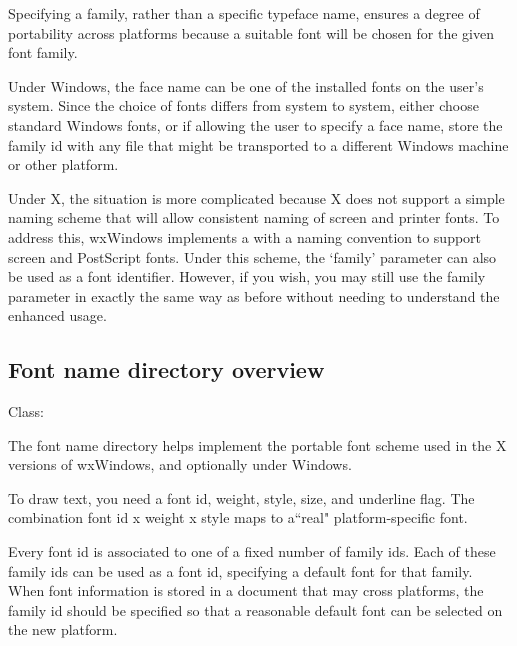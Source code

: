 Specifying a family, rather than a specific typeface name, ensures a degree of portability
across platforms because a suitable font will be chosen for the given font family.

Under Windows, the face name can be one of the installed fonts on the user's system. Since
the choice of fonts differs from system to system, either choose standard Windows fonts,
or if allowing the user to specify a face name, store the family id with any file that
might be transported to a different Windows machine or other platform.

Under X, the situation is more complicated because X does not support a simple naming scheme
that will allow consistent naming of screen and printer fonts. To address this, wxWindows
implements a  with a naming convention
to support screen and PostScript fonts. Under this scheme, the `family' parameter can also
be used as a font identifier. However, if you wish, you may still
use the family parameter in exactly the same way as before without needing to understand
the enhanced usage.


\subsection{Font name directory overview}\label{wxfontnamedirectoryoverview}

Class: 

The font name directory helps implement the portable font scheme used
in the X versions of wxWindows, and optionally under Windows.

To draw text, you need a font id, weight, style, size, and underline
flag. The combination font id x weight x style maps to a``real" 
platform-specific font.

Every font id is associated to one of a fixed number of family ids.
Each of these family ids can be used as a font id, specifying a
default font for that family. When font information is stored in a
document that may cross platforms, the family id should be specified
so that a reasonable default font can be selected on the new platform.

